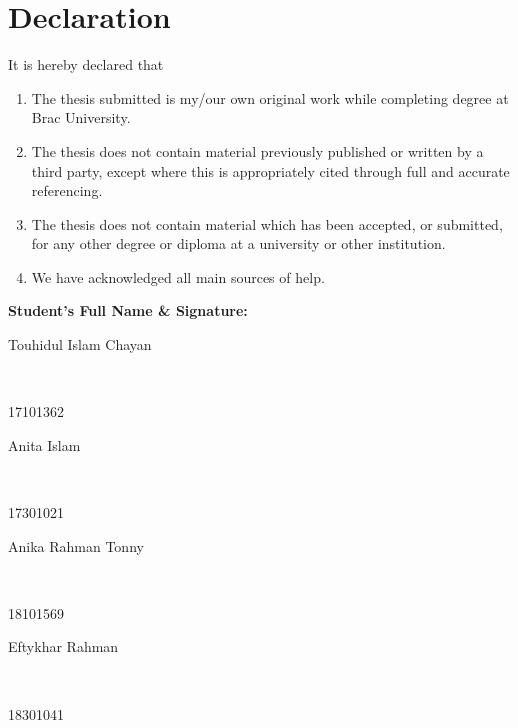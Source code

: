 \newcommand*\wildcard[2][6cm]{\vspace{2cm}\parbox{#1}{\hrulefill\par#2}} 


\section*{Declaration}

It is hereby declared that

\begin{enumerate} %
  \item The thesis submitted is my/our own original work while completing degree at Brac University.
  \item The thesis does not contain material previously published or written by a third party, except where this is appropriately cited through full and accurate referencing.
  \item The thesis does not contain material which has been accepted, or submitted, for any other degree or diploma at a university or other institution.
  \item We have acknowledged all main sources of help.
\end{enumerate}

\vspace{1cm}
\textbf{Student’s Full Name \& Signature:} %

\begingroup
    \begin{center}
        
        \wildcard{\centerline{Touhidul Islam Chayan} \\ \centerline{17101362}} 
        \hspace{2cm}
        \wildcard{\centerline{Anita Islam} \\ \centerline{17301021} }
        \wildcard{\centerline{Anika Rahman Tonny} \\ \centerline{18101569} }
        \hspace{2cm}
        \wildcard{\centerline{Eftykhar Rahman \\} \\ \centerline{18301041} }
    \end{center}
\endgroup


\pagebreak






